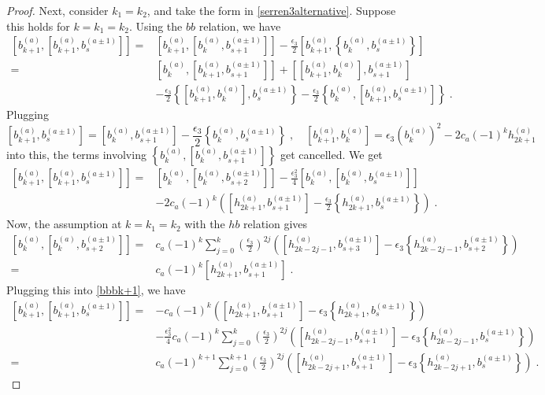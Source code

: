 \documentclass[11pt]{article}
\numberwithin{equation}{section}
\numberwithin{figure}{section}
\numberwithin{table}{section}
\begin{document}
\begin{proof}
Next, consider $k_1=k_2$, and take the form in \eqref{serren3alternative}. Suppose this holds for $k=k_1=k_2$. Using the $bb$ relation, we have
\begin{align}
	\left[b^{(a)}_{k+1},\left[b^{(a)}_{k+1},b^{(a\pm1)}_s\right]\right]=&\left[b^{(a)}_{k+1},\left[b^{(a)}_k,b^{(a\pm1)}_{s+1}\right]\right]-\frac{\epsilon_3}{2}\left[b^{(a)}_{k+1},\left\{b^{(a)}_k,b^{(a\pm1)}_s\right\}\right]\nonumber\\
	=&\left[b^{(a)}_k,\left[b^{(a)}_{k+1},b^{(a\pm1)}_{s+1}\right]\right]+\left[\left[b^{(a)}_{k+1},b^{(a)}_k\right],b^{(a\pm1)}_{s+1}\right]\nonumber\\
	&-\frac{\epsilon_3}{2}\left\{\left[b^{(a)}_{k+1},b^{(a)}_k\right],b^{(a\pm1)}_s\right\}-\frac{\epsilon_3}{2}\left\{b^{(a)}_k,\left[b^{(a)}_{k+1},b^{(a\pm1)}_s\right]\right\}\;.
\end{align}
Plugging
\begin{equation}
	\left[b^{(a)}_{k+1},b^{(a\pm1)}_s\right]=\left[b^{(a)}_k,b^{(a\pm1)}_{s+1}\right]-\frac{\epsilon_3}{2}\left\{b^{(a)}_k,b^{(a\pm1)}_s\right\}\;,\quad\left[b^{(a)}_{k+1},b^{(a)}_k\right]=\epsilon_3\left(b^{(a)}_k\right)^2-2c_a(-1)^kh^{(a)}_{2k+1}
\end{equation}
into this, the terms involving $\left\{b^{(a)}_k,\left[b^{(a)}_k,b^{(a\pm1)}_{s+1}\right]\right\}$ get cancelled. We get
\begin{align}
	\left[b^{(a)}_{k+1},\left[b^{(a)}_{k+1},b^{(a\pm1)}_s\right]\right]=&\left[b^{(a)}_k,\left[b^{(a)}_k,b^{(a\pm1)}_{s+2}\right]\right]-\frac{\epsilon_3^2}{4}\left[b^{(a)}_k,\left[b^{(a)}_k,b^{(a\pm1)}_s\right]\right]\nonumber\\
	&-2c_a(-1)^k\left(\left[h^{(a)}_{2k+1},b^{(a\pm1)}_{s+1}\right]-\frac{\epsilon_3}{2}\left\{h^{(a)}_{2k+1},b^{(a\pm1)}_s\right\}\right)\;.\label{bbbk+1}
\end{align}
Now, the assumption at $k=k_1=k_2$ with the $hb$ relation gives
\begin{align}
	\left[b^{(a)}_k,\left[b^{(a)}_k,b^{(a\pm1)}_{s+2}\right]\right]=&c_a(-1)^k\sum_{j=0}^k\left(\frac{\epsilon_3}{2}\right)^{2j}\left(\left[h^{(a)}_{2k-2j-1},b^{(a\pm1)}_{s+3}\right]-\epsilon_3\left\{h^{(a)}_{2k-2j-1},b^{(a\pm1)}_{s+2}\right\}\right)\nonumber\\
	=&c_a(-1)^k\left[h^{(a)}_{2k+1},b^{(a\pm1)}_{s+1}\right]\;.
\end{align}
Plugging this into \eqref{bbbk+1}, we have
\begin{align}
	\left[b^{(a)}_{k+1},\left[b^{(a)}_{k+1},b^{(a\pm1)}_s\right]\right]=&-c_a(-1)^k\left(\left[h^{(a)}_{2k+1},b^{(a\pm1)}_{s+1}\right]-\epsilon_3\left\{h^{(a)}_{2k+1},b^{(a\pm1)}_s\right\}\right)\nonumber\\
	&-\frac{\epsilon_3^2}{4}c_a(-1)^k\sum_{j=0}^k\left(\frac{\epsilon_3}{2}\right)^{2j}\left(\left[h^{(a)}_{2k-2j-1},b^{(a\pm1)}_{s+1}\right]-\epsilon_3\left\{h^{(a)}_{2k-2j-1},b^{(a\pm1)}_s\right\}\right)\nonumber\\
	=&c_a(-1)^{k+1}\sum_{j=0}^{k+1}\left(\frac{\epsilon_3}{2}\right)^{2j}\left(\left[h^{(a)}_{2k-2j+1},b^{(a\pm1)}_{s+1}\right]-\epsilon_3\left\{h^{(a)}_{2k-2j+1},b^{(a\pm1)}_s\right\}\right)\;.
\end{align}


\end{proof}
\end{document}
